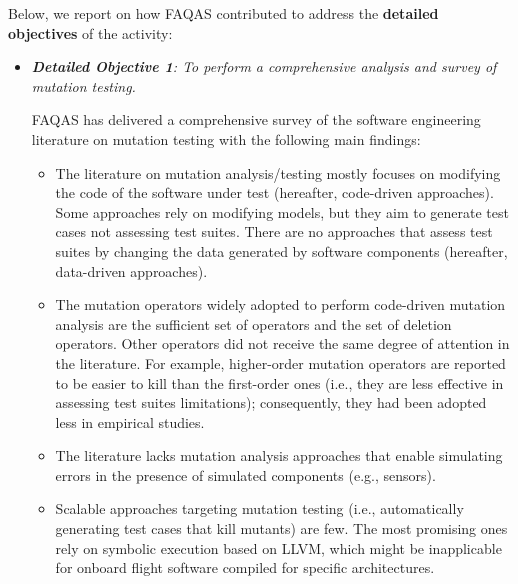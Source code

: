 Below, we report on how FAQAS contributed to address the \textbf{detailed objectives} of the activity:
\begin{itemize}
\item {\emph{\textbf{Detailed Objective 1}: To perform a comprehensive analysis and survey of mutation testing.}}

%

FAQAS has delivered a comprehensive survey of the software engineering literature on mutation testing with the following main findings:
\begin{itemize}
\item	The literature on mutation analysis/testing mostly focuses on modifying the code of the software under test (hereafter, code-driven approaches). Some approaches rely on modifying models, but they aim to generate test cases not assessing test suites. There are no approaches that assess test suites by changing the data generated by software components (hereafter, data-driven approaches).
\item The mutation operators widely adopted to perform code-driven mutation analysis are the sufficient set of operators and the set of deletion operators. Other operators did not receive the same degree of attention in the literature. For example, higher-order mutation operators are reported to be easier to kill than the first-order ones (i.e., they are less effective in assessing test suites limitations); consequently, they had been adopted less in empirical studies.
\item The literature lacks mutation analysis approaches that enable simulating errors in the presence of simulated components (e.g., sensors).
\item Scalable approaches targeting mutation testing (i.e., automatically generating test cases that kill mutants) are few. The most promising ones rely on symbolic execution based on LLVM, which might be inapplicable for onboard flight software compiled for specific architectures.
\end{itemize}


\end{itemize}
